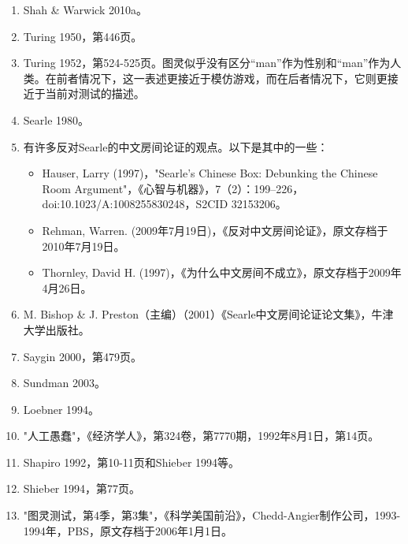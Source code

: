 \begin{enumerate}
\item Shah & Warwick 2010a。
\item Turing 1950，第446页。
\item Turing 1952，第524-525页。图灵似乎没有区分“man”作为性别和“man”作为人类。在前者情况下，这一表述更接近于模仿游戏，而在后者情况下，它则更接近于当前对测试的描述。
\item Searle 1980。
\item 有许多反对Searle的中文房间论证的观点。以下是其中的一些：
\begin{itemize}
\item Hauser, Larry (1997)，"Searle's Chinese Box: Debunking the Chinese Room Argument"，《心智与机器》，7（2）：199–226，doi:10.1023/A:1008255830248，S2CID 32153206。
\item Rehman, Warren. (2009年7月19日)，《反对中文房间论证》，原文存档于2010年7月19日。
\item Thornley, David H. (1997)，《为什么中文房间不成立》，原文存档于2009年4月26日。
\end{itemize}
\item M. Bishop & J. Preston（主编）（2001）《Searle中文房间论证论文集》，牛津大学出版社。
\item Saygin 2000，第479页。
\item Sundman 2003。
\item Loebner 1994。
\item "人工愚蠢"，《经济学人》，第324卷，第7770期，1992年8月1日，第14页。
\item Shapiro 1992，第10-11页和Shieber 1994等。
\item Shieber 1994，第77页。
\item "图灵测试，第4季，第3集"，《科学美国前沿》，Chedd-Angier制作公司，1993-1994年，PBS，原文存档于2006年1月1日。





\end{enumerate}
